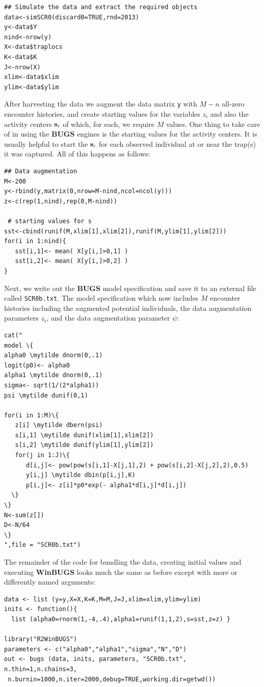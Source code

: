 {\small
\begin{verbatim}
## Simulate the data and extract the required objects
data<-simSCR0(discard0=TRUE,rnd=2013)
y<-data$Y
nind<-nrow(y)
X<-data$traplocs
K<-data$K
J<-nrow(X)
xlim<-data$xlim
ylim<-data$ylim
\end{verbatim}
}
 After harvesting the data we
 augment the data matrix \mbox{\tt y}
with $M-n$ all-zero encounter histories, and create starting
values for the variables $z_{i}$ and also the activity centers ${\bf
  s}_{i}$ of which, for each, we require $M$ values. 
 One thing to take care of in using the {\bf BUGS}
engines is the starting values for the activity centers. It is usually
helpful to start the ${\bf s}_{i}$ for each observed individual at or
near the trap(s) it was captured. All of this happens as follows:
{\small
\begin{verbatim}
## Data augmentation 
M<-200
y<-rbind(y,matrix(0,nrow=M-nind,ncol=ncol(y)))
z<-c(rep(1,nind),rep(0,M-nind))

 # starting values for s
sst<-cbind(runif(M,xlim[1],xlim[2]),runif(M,ylim[1],ylim[2])) 
for(i in 1:nind){
   sst[i,1]<- mean( X[y[i,]>0,1] )
   sst[i,2]<- mean( X[y[i,]>0,2] )
}
\end{verbatim}
}
Next, we write out the {\bf BUGS} model specification and save it to
an external file called \mbox{\tt SCR0b.txt}. The model 
 specification which now includes $M$
encounter histories including the augmented potential individuals, the
data augmentation parameters $z_{i}$, and the data augmentation
parameter $\psi$:
{\small
\begin{Verbatim}[commandchars=\\\{\}]
cat("
model \{
alpha0 \mytilde dnorm(0,.1)
logit(p0)<- alpha0
alpha1 \mytilde dnorm(0,.1)
sigma<- sqrt(1/(2*alpha1))
psi \mytilde dunif(0,1)

for(i in 1:M)\{    
   z[i] \mytilde dbern(psi)
   s[i,1] \mytilde dunif(xlim[1],xlim[2])
   s[i,2] \mytilde dunif(ylim[1],ylim[2])
   for(j in 1:J)\{
      d[i,j]<- pow(pow(s[i,1]-X[j,1],2) + pow(s[i,2]-X[j,2],2),0.5)
      y[i,j] \mytilde dbin(p[i,j],K)
      p[i,j]<- z[i]*p0*exp(- alpha1*d[i,j]*d[i,j])
  \}
\}
N<-sum(z[])
D<-N/64
\}
",file = "SCR0b.txt")
\end{Verbatim}
}
The 
remainder of the code for bundling the data, creating initial values
and executing {\bf WinBUGS} looks much the same as before except with more
or differently named arguments:
{\small
\begin{verbatim}
data <- list (y=y,X=X,K=K,M=M,J=J,xlim=xlim,ylim=ylim)
inits <- function(){
  list (alpha0=rnorm(1,-4,.4),alpha1=runif(1,1,2),s=sst,z=z) }

library("R2WinBUGS")
parameters <- c("alpha0","alpha1","sigma","N","D")
out <- bugs (data, inits, parameters, "SCR0b.txt", n.thin=1,n.chains=3,
 n.burnin=1000,n.iter=2000,debug=TRUE,working.dir=getwd())
\end{verbatim}
}

